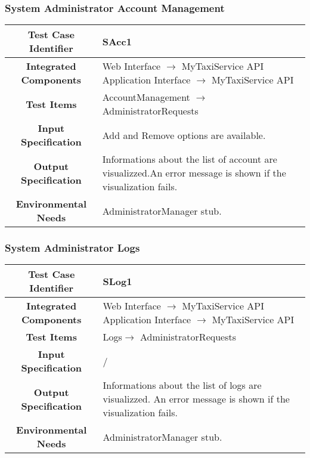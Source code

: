 \documentclass[11pt, a4paper,titlepage]{article}
\begin{document}
	\subsubsection{System Administrator Account Management}
	\begin{tabularx}{\textwidth}{| c|X|}
		\hline \textbf{Test Case Identifier} & \label{SAcc1}SAcc1 \\
		\hline \textbf{Integrated Components} & Web Interface $\rightarrow $ MyTaxiService API \newline 
		Application Interface $\rightarrow $ MyTaxiService API \\
		\hline \textbf{Test Items} & AccountManagement $\rightarrow $ AdministratorRequests \\
		\hline \textbf{Input Specification} & Add and Remove options are available. \\
		\hline \textbf{Output Specification} & Informations about the list of account are visualizzed.\newline An error message is shown if the visualization fails. \\
		\hline \textbf{Environmental Needs} & AdministratorManager stub. \\
		\hline
	\end{tabularx}
	\newline
	\newline
	\subsubsection{System Administrator Logs}
	\begin{tabularx}{\textwidth}{| c|X|}
		\hline \textbf{Test Case Identifier} & \label{SLog1}SLog1 \\
		\hline \textbf{Integrated Components} & Web Interface $\rightarrow $ MyTaxiService API \newline 
		Application Interface $\rightarrow $ MyTaxiService API \\
		\hline \textbf{Test Items} & Logs$\rightarrow $ AdministratorRequests  \\
		\hline \textbf{Input Specification} & / \\
		\hline \textbf{Output Specification} & Informations about the list of logs are visualizzed.\newline
		An error message is shown if the visualization fails. \\
		\hline \textbf{Environmental Needs} & AdministratorManager stub. \\
		\hline
	\end{tabularx}
	\newline
	\newline
\end{document}
